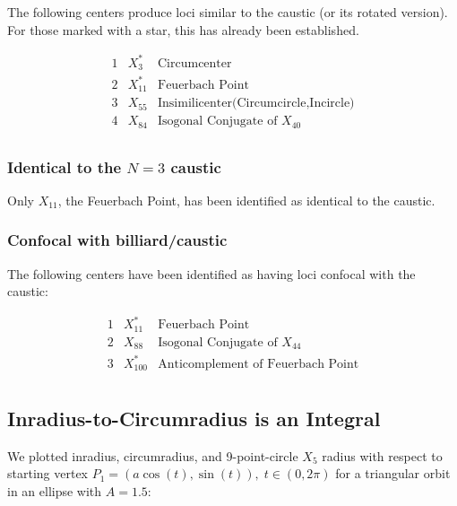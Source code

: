 \documentclass[]{article}
\begin{document}
The following centers produce loci similar to the caustic (or its rotated version). For those marked with a star, this has already been established.

\[
\begin{array}{cll}
 1 & X_{3}^* & \text{Circumcenter} \\
 2 & X_{11}^* & \text{Feuerbach Point} \\
 3 & X_{55} & \text{Insimilicenter(Circumcircle,Incircle)} \\
 4 & X_{84} & \text{Isogonal Conjugate of $X_{40}$} \\
\end{array}
\]

\hypertarget{identical-to-the-n3-caustic}{%
\subsubsection{\texorpdfstring{Identical to the \(N=3\) caustic}{Identical to the N=3 caustic}}\label{identical-to-the-n3-caustic}}

Only \(X_{11}\), the Feuerbach Point, has been identified as identical to the caustic.

\hypertarget{confocal-with-billiardcaustic}{%
\subsubsection{Confocal with billiard/caustic}\label{confocal-with-billiardcaustic}}

The following centers have been identified as having loci confocal with the caustic:

\[
\begin{array}{cll}
 1 & X_{11}^* & \text{Feuerbach Point} \\
 2 & X_{88} & \text{Isogonal Conjugate of $X_{44}$} \\
 3 & X_{100}^* & \text{Anticomplement of Feuerbach Point} \\
\end{array}
\]

\hypertarget{inradius-to-circumradius-is-an-integral}{%
\subsection{Inradius-to-Circumradius is an Integral}\label{inradius-to-circumradius-is-an-integral}}

We plotted inradius, circumradius, and 9-point-circle \(X_{5}\) radius with respect to starting vertex \(P_1=(a \cos(t),\sin(t)),\;t\in(0,2\pi)\) for a triangular orbit in an ellipse with \(A=1.5\):
\end{document}
